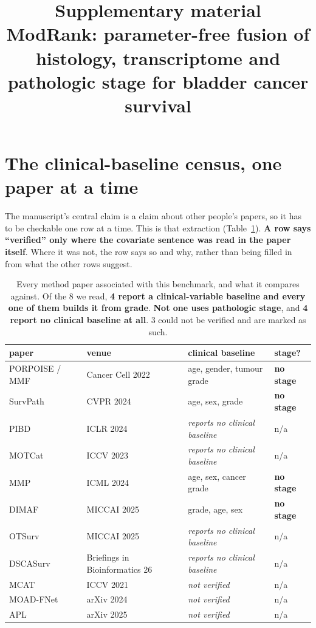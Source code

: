 \documentclass[11pt]{article}
\title{Supplementary material\\[0.3em]
\large ModRank: parameter-free fusion of histology, transcriptome and pathologic stage
for bladder cancer survival}
\date{}
\begin{document}
\maketitle
\tableofcontents
\newpage

\section{The clinical-baseline census, one paper at a time}

The manuscript's central claim is a claim about other people's papers, so it has to be checkable one
row at a time. This is that extraction (Table~\ref{tab:sup-census}). \textbf{A row says ``verified'' only where
the covariate sentence was read in the paper itself}. Where it was not, the row says so and why, rather than
being filled in from what the other rows suggest.

\begin{table}[h]
\centering
{\small
\begin{tabular}{llll}
\toprule
paper & venue & clinical baseline & stage? \\
\midrule
PORPOISE / MMF~\cite{chen2022porpoise} & Cancer Cell 2022 & age, gender, tumour grade & \textbf{no stage} \\
SurvPath~\cite{jaume2024survpath} & CVPR 2024 & age, sex, grade & \textbf{no stage} \\
PIBD~\cite{zhang2024pibd} & ICLR 2024 & \emph{reports no clinical baseline} & n/a \\
MOTCat~\cite{xu2023motcat} & ICCV 2023 & \emph{reports no clinical baseline} & n/a \\
MMP~\cite{song2024mmp} & ICML 2024 & age, sex, cancer grade & \textbf{no stage} \\
DIMAF~\cite{eijpe2025dimaf} & MICCAI 2025 & grade, age, sex & \textbf{no stage} \\
OTSurv~\cite{ren2025otsurv} & MICCAI 2025 & \emph{reports no clinical baseline} & n/a \\
DSCASurv~\cite{song2025dscasurv} & Briefings in Bioinformatics 26 & \emph{reports no clinical baseline} & n/a \\
MCAT~\cite{chen2021mcat} & ICCV 2021 & \emph{not verified} & n/a \\
MOAD-FNet~\cite{moadfnet2024} & arXiv 2024 & \emph{not verified} & n/a \\
APL~\cite{apl2025} & arXiv 2025 & \emph{not verified} & n/a \\
\bottomrule
\end{tabular}}
\caption{Every method paper associated with this benchmark, and what it compares against. Of the
8 we read, \textbf{4 report a clinical-variable baseline and every one of them builds it from
grade}. \textbf{Not one uses pathologic stage}, and \textbf{4 report no clinical baseline at all}.
3 could not be verified and are marked as such.}
\label{tab:sup-census}
\end{table}
\end{document}
